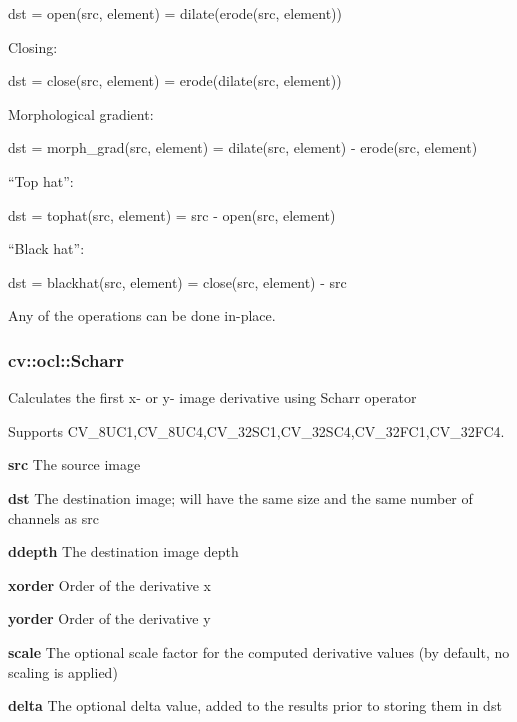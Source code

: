 \documentclass{article}
\begin{document}
\begin{center}
dst = open(src, element) = dilate(erode(src, element))
\end{center}

Closing:

\begin{center}
dst = close(src, element) = erode(dilate(src, element))
\end{center}

Morphological gradient:

\begin{center}
dst = morph{\_}grad(src, element) = dilate(src, element) - erode(src,
element)
\end{center}

``Top hat'':

\begin{center}
dst = tophat(src, element) = src - open(src, element)
\end{center}

``Black hat'':

\begin{center}
dst = blackhat(src, element) = close(src, element) - src
\end{center}

Any of the operations can be done in-place.

\newpage

\subsubsection{cv::ocl::Scharr}
\label{subsubsec:mylabel42}
Calculates the first x- or y- image derivative using Scharr operator

Supports CV{\_}8UC1,CV{\_}8UC4,CV{\_}32SC1,CV{\_}32SC4,CV{\_}32FC1,CV{\_}32FC4.

\textbf{src }The source image

\textbf{dst }The destination image; will have the same size and the same
number of channels as src

\textbf{ddepth }The destination image depth

\textbf{xorder }Order of the derivative x

\textbf{yorder }Order of the derivative y

\textbf{scale }The optional scale factor for the computed derivative values
(by default, no scaling is applied)

\textbf{delta }The optional delta value, added to the results prior to
storing them in dst
\end{document}
